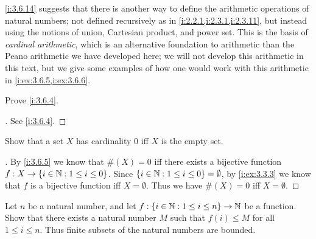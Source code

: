 \begin{rmk}\label{i:3.6.15}
  \cref{i:3.6.14} suggests that there is another way to define the arithmetic operations of natural numbers;
  not defined recursively as in \cref{i:2.2.1,i:2.3.1,i:2.3.11}, but instead using the notions of union, Cartesian product, and power set.
  This is the basis of \emph{cardinal arithmetic}, which is an alternative foundation to arithmetic than the Peano arithmetic we have developed here;
  we will not develop this arithmetic in this text, but we give some examples of how one would work with this arithmetic in \cref{i:ex:3.6.5,i:ex:3.6.6}.
\end{rmk}

\exercisesection

\begin{ex}\label{i:ex:3.6.1}
  Prove \cref{i:3.6.4}.
\end{ex}

\begin{proof}[]
  See \cref{i:3.6.4}.
\end{proof}

\begin{ex}\label{i:ex:3.6.2}
  Show that a set \(X\) has cardinality \(0\) iff \(X\) is the empty set.
\end{ex}

\begin{proof}[]
  By \cref{i:3.6.5} we know that \(\#(X) = 0\) iff there exists a bijective function \(f : X \to \left\lbrace i \in \mathbb{N} : 1 \leq i \leq 0\right\rbrace\).
  Since \(\left\lbrace i \in \mathbb{N} : 1 \leq i \leq 0\right\rbrace = \emptyset\), by \cref{i:ex:3.3.3} we know that \(f\) is a bijective function iff \(X = \emptyset\).
  Thus we have \(\#(X) = 0\) iff \(X = \emptyset\).
\end{proof}

\begin{ex}\label{i:ex:3.6.3}
  Let \(n\) be a natural number, and let \(f : \left\lbrace i \in \mathbb{N} : 1 \leq i \leq n\right\rbrace \to \mathbb{N}\) be a function.
  Show that there exists a natural number \(M\) such that \(f(i) \leq M\) for all \(1 \leq i \leq n\).
  Thus finite subsets of the natural numbers are bounded.
\end{ex}

